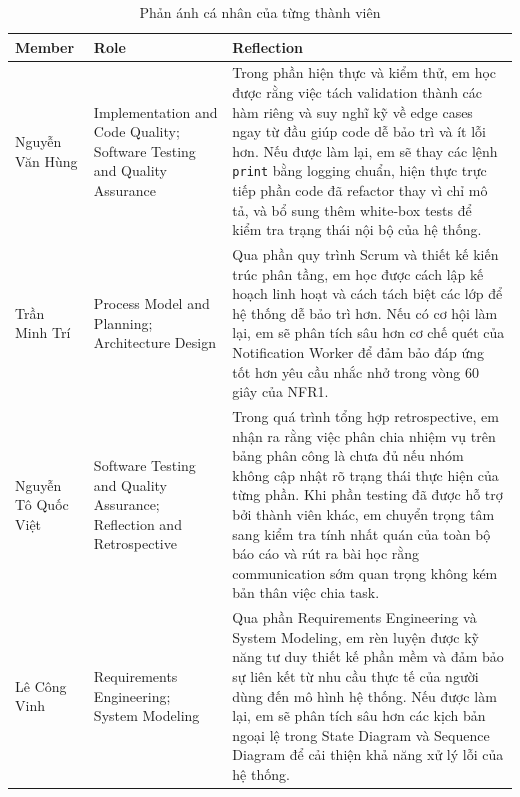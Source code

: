 \begin{table}[h]
\centering
\renewcommand{\arraystretch}{1.5}
\begin{tabularx}{\linewidth}{|l|p{4cm}|X|}
\hline
\textbf{Member} & \textbf{Role} & \textbf{Reflection} \\
\hline
Nguyễn Văn Hùng & Implementation and Code Quality; Software Testing and Quality Assurance & Trong phần hiện thực và kiểm thử, em học được rằng việc tách validation thành các hàm riêng và suy nghĩ kỹ về edge cases ngay từ đầu giúp code dễ bảo trì và ít lỗi hơn. Nếu được làm lại, em sẽ thay các lệnh \texttt{print} bằng logging chuẩn, hiện thực trực tiếp phần code đã refactor thay vì chỉ mô tả, và bổ sung thêm white-box tests để kiểm tra trạng thái nội bộ của hệ thống. \\
\hline
Trần Minh Trí & Process Model and Planning; Architecture Design & Qua phần quy trình Scrum và thiết kế kiến trúc phân tầng, em học được cách lập kế hoạch linh hoạt và cách tách biệt các lớp để hệ thống dễ bảo trì hơn. Nếu có cơ hội làm lại, em sẽ phân tích sâu hơn cơ chế quét của Notification Worker để đảm bảo đáp ứng tốt hơn yêu cầu nhắc nhở trong vòng 60 giây của NFR1. \\
\hline
Nguyễn Tô Quốc Việt & Software Testing and Quality Assurance; Reflection and Retrospective & Trong quá trình tổng hợp retrospective, em nhận ra rằng việc phân chia nhiệm vụ trên bảng phân công là chưa đủ nếu nhóm không cập nhật rõ trạng thái thực hiện của từng phần. Khi phần testing đã được hỗ trợ bởi thành viên khác, em chuyển trọng tâm sang kiểm tra tính nhất quán của toàn bộ báo cáo và rút ra bài học rằng communication sớm quan trọng không kém bản thân việc chia task. \\
\hline
Lê Công Vinh & Requirements Engineering; System Modeling & Qua phần Requirements Engineering và System Modeling, em rèn luyện được kỹ năng tư duy thiết kế phần mềm và đảm bảo sự liên kết từ nhu cầu thực tế của người dùng đến mô hình hệ thống. Nếu được làm lại, em sẽ phân tích sâu hơn các kịch bản ngoại lệ trong State Diagram và Sequence Diagram để cải thiện khả năng xử lý lỗi của hệ thống. \\
\hline
\end{tabularx}
\caption{Phản ánh cá nhân của từng thành viên}
\end{table}
